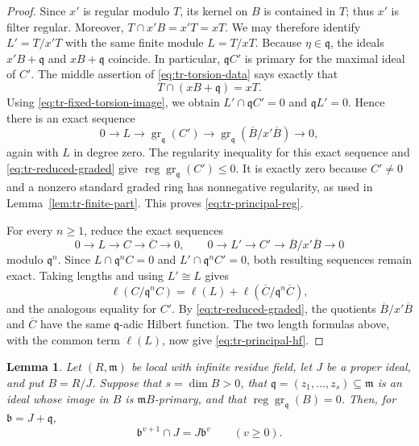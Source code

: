 \documentclass[11pt,reqno]{amsart}
\numberwithin{equation}{section}
\newtheorem{lemma}[theorem]{Lemma}
\theoremstyle{definition}
\begin{document}
\begin{proof}
Since $x'$ is regular modulo $T$, its kernel on $B$ is contained in $T$;
thus $x'$ is filter regular. Moreover,
$T\cap x'B=x'T=xT$. We may therefore identify
$L'=T/x'T$ with the same finite module $L=T/xT$.
Because $\eta\in\mathfrak q$, the ideals
$x'B+\mathfrak q$ and $xB+\mathfrak q$ coincide. In particular,
$\mathfrak qC'$ is primary for the maximal ideal of $C'$.
The middle assertion
of \eqref{eq:tr-torsion-data} says exactly that
\[
 T\cap(xB+\mathfrak q)=xT.
\]
Using \eqref{eq:tr-fixed-torsion-image}, we obtain
$L'\cap\mathfrak qC'=0$ and $\mathfrak qL'=0$.
Hence there is an exact sequence
\[
 0\longrightarrow L\longrightarrow
 \operatorname{gr}_{\mathfrak q}(C')\longrightarrow
 \operatorname{gr}_{\mathfrak q}(\overline B/x'\overline B)
 \longrightarrow0,
\]
again with $L$ in degree zero. The regularity inequality for this
exact sequence and \eqref{eq:tr-reduced-graded} give
$\operatorname{reg}\operatorname{gr}_{\mathfrak q}(C')\leq0$.
It is exactly zero because $C'\neq0$ and a nonzero
standard graded ring has nonnegative regularity, as used in
Lemma~\ref{lem:tr-finite-part}. This proves
\eqref{eq:tr-principal-reg}.

For every $n\geq1$, reduce the exact sequences
\[
 0\to L\to C\to\overline C\to0,
 \qquad
 0\to L'\to C'\to\overline B/x'\overline B\to0
\]
modulo $\mathfrak q^n$.
Since $L\cap\mathfrak q^nC=0$ and
$L'\cap\mathfrak q^nC'=0$, both resulting sequences remain
exact. Taking lengths and using $L'\cong L$ gives
\[
 \ell(C/\mathfrak q^nC)
 =\ell(L)+\ell(\overline C/\mathfrak q^n\overline C),
\]
and the analogous equality for $C'$. By \eqref{eq:tr-reduced-graded},
the quotients $\overline B/x'\overline B$ and $\overline C$
have the same $\mathfrak q$-adic Hilbert function.
The two length formulas above, with the common term $\ell(L)$,
now give \eqref{eq:tr-principal-hf}.
\end{proof}

\begin{lemma}
\label{lem:tr-parameter-intersection}
Let $(R,\mathfrak m)$ be local with infinite residue field, let $J$
be a proper ideal, and put $B=R/J$. Suppose that $s=\dim B>0$, that
$\mathfrak q=(z_1,\ldots,z_s)\subseteq\mathfrak m$ is an ideal
whose image in $B$ is $\mathfrak mB$-primary, and that
$\operatorname{reg}\operatorname{gr}_{\mathfrak q}(B)=0$.
Then, for $\mathfrak b=J+\mathfrak q$,
\begin{equation}\label{eq:tr-intersection}
 \mathfrak b^{v+1}\cap J=J\mathfrak b^v\qquad(v\geq0).
\end{equation}
\end{lemma}
\end{document}
